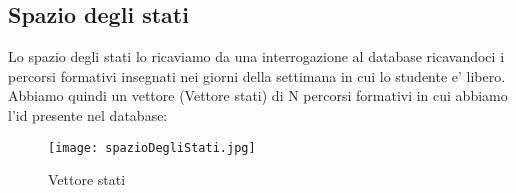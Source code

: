 \documentclass[10pt,a4paper]{article}
\begin{document}
    \subsection{Spazio degli stati}
      \label{spazioDegliStatiSubsection}
      Lo spazio degli stati lo ricaviamo da una interrogazione al database ricavandoci i percorsi formativi
      insegnati nei giorni della settimana in cui lo studente e' libero.\\
      Abbiamo quindi un vettore (Vettore stati) di N percorsi formativi in cui abbiamo l'id presente nel database:\\
      \begin{figure}[h!]
        \centering
        \caption{Vettore stati}
        \texttt{[image: spazioDegliStati.jpg]}
        \label{vettoreStati}
      \end{figure}\\
      
\end{document}
